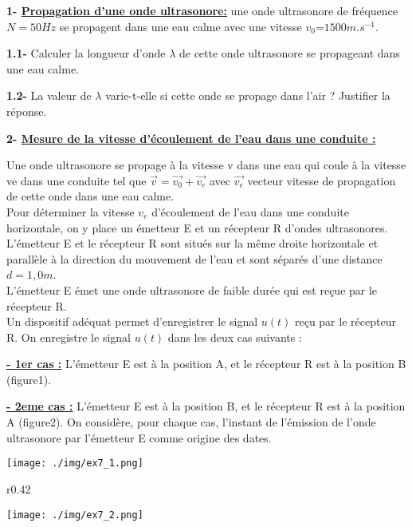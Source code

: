 \documentclass[12pt, french]{article}
\begin{document}
\textbf{1- \underline{Propagation d’une onde ultrasonore:}}
une onde ultrasonore de fréquence $N=50Hz$ se propagent dans une eau calme avec une vitesse
$v_0$=$1500 m.s^{-1}$.

\textbf{1.1- }Calculer la longueur d’onde $\lambda$ de cette onde ultrasonore se propageant dans une eau calme.

\textbf{1.2- }La valeur de $\lambda$ varie-t-elle si cette onde se propage dans l’air ? Justifier la réponse.

\textbf{2- \underline{Mesure de la vitesse d’écoulement de l’eau dans une conduite :}}

Une onde ultrasonore se propage à la vitesse v dans une eau qui coule à la vitesse ve dans une
conduite tel que $\vec{v} = \vec{v_0} + \vec{v_e}$ avec $\vec{v_e}$ vecteur vitesse de propagation de cette onde dans une eau calme.
\\Pour déterminer la vitesse $v_e$ d’écoulement de l’eau dans une conduite horizontale, on y place un
émetteur E et un récepteur R d’ondes ultrasonores.
\\L’émetteur E et le récepteur R sont situés sur la même droite horizontale et parallèle à la direction
du mouvement de l’eau et sont séparés d’une distance $d=1,0m$.
\\L’émetteur E émet une onde ultrasonore de faible durée qui est reçue par le récepteur R.
\\Un dispositif adéquat permet d’enregistrer le signal $u(t)$ reçu par le récepteur R. On enregistre le
signal $u(t)$ dans les deux cas suivants :

\textbf{ \underline{- 1er cas :}} L’émetteur E est à la position A, et le récepteur R est à la position B (figure1).

\textbf{\underline{- 2eme cas :}} L’émetteur E est à la position B, et le récepteur R est à la position A (figure2).
On considère, pour chaque cas, l’instant de l’émission de l’onde ultrasonore par l’émetteur E comme
origine des dates.

  \begin{center}
	  \vspace{-0.56cm}
	\texttt{[image: ./img/ex7\_1.png]}
  \end{center}


\begin{wrapfigure}[8]{r}{0.42\textwidth}
  \begin{center}
	  \vspace{-0.6cm}
	\texttt{[image: ./img/ex7\_2.png]}
  \end{center}
\end{wrapfigure}
\end{document}

